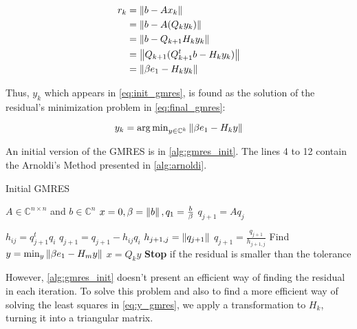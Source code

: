 \begin{align} \label{eq:final_gmres}
    \begin{split}
        r_{k} &= \left\lVert b - Ax_{k}\right\rVert\\
        &= \left\lVert b - A(Q_{k}y_{k})\right\rVert\\
        &= \left\lVert b-Q_{k+1}H_{k}y_{k}\right\rVert \\
        &= \left\lVert Q_{k+1}(Q_{k+1}^{t}b-H_{k}y_{k})\right\rVert \\
        &= \left\lVert\beta e_{1} - H_{k}y_{k}\right\rVert
    \end{split}
\end{align}


Thus, $y_{k}$ which appears in \ref{eq:init_gmres}, is found as the solution of the residual's minimization problem  in \ref{eq:final_gmres}:

\begin{equation}\label{eq:y_gmres}
    y_{k} = \operatorname{arg\,min}_{y \in \mathbb{C}^{k}} \left\lVert\beta e_{1} - H_{k}y\right\rVert
\end{equation}

An initial version of the GMRES is in \ref{alg:gmres_init}. The lines 4 to 12 contain the Arnoldi's Method presented in \ref{alg:arnoldi}.

\begin{algorithm}
    \caption{Initial GMRES}\label{alg:gmres_init}
    \begin{algorithmic}[1]
        \State $A \in \mathbb{C}^{n \times n}$ and $b\in \mathbb{C}^{n}$
        \State $x=0, \beta=\left\lVert b\right\rVert,q_{1}=\frac{b}{\beta}$
        \State $q_{j+1} = Aq_{j}$

        \State $h_{ij}= q_{j+1}^{t}q_{i}$
        \State $q_{j+1} = q_{j+1} - h_{ij}q_{i}$
        \EndFor
        \State $h_{j+1,j}=\left\lVert q_{j+1}\right\rVert$
        \State $q_{j+1} = \frac{q_{j+1}}{h_{j+1,j}}$
        \EndFor
        \State Find $y = \min_{y} \left\lVert\beta e_{1} - H_{m}y\right\rVert$
        \State $x = Q_{k}y$
        \State \textbf{Stop} if the residual is smaller than the tolerance
        \EndFor
    \end{algorithmic}
\end{algorithm}

However, \ref{alg:gmres_init} doesn't present an efficient way of finding the residual in each iteration. To solve this problem and also to find a more efficient way of solving the least squares in \ref{eq:y_gmres}, we apply a transformation to $H_{k}$, turning it into a triangular matrix.

